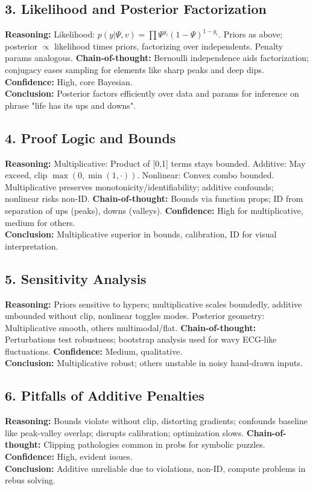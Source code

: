 \documentclass{article}
\begin{document}
\subsection{3. Likelihood and Posterior Factorization}
\textbf{Reasoning:} Likelihood: \(p(y|\Psi,v) = \prod \Psi^{y_i} (1-\Psi)^{1-y_i}\). Priors as above; posterior \(\propto\) likelihood times priors, factorizing over independents. Penalty params analogous. \textbf{Chain-of-thought:} Bernoulli independence aids factorization; conjugacy eases sampling for elements like sharp peaks and deep dips. \textbf{Confidence:} High, core Bayesian.\\
\textbf{Conclusion:} Posterior factors efficiently over data and params for inference on phrase "life has its ups and downs".

\subsection{4. Proof Logic and Bounds}
\textbf{Reasoning:} Multiplicative: Product of [0,1] terms stays bounded. Additive: May exceed, clip \(\max(0,\min(1,\cdot))\). Nonlinear: Convex combo bounded. Multiplicative preserves monotonicity/identifiability; additive confounds; nonlinear risks non-ID. \textbf{Chain-of-thought:} Bounds via function props; ID from separation of ups (peaks), downs (valleys). \textbf{Confidence:} High for multiplicative, medium for others.\\
\textbf{Conclusion:} Multiplicative superior in bounds, calibration, ID for visual interpretation.

\subsection{5. Sensitivity Analysis}
\textbf{Reasoning:} Priors sensitive to hypers; multiplicative scales boundedly, additive unbounded without clip, nonlinear toggles modes. Posterior geometry: Multiplicative smooth, others multimodal/flat. \textbf{Chain-of-thought:} Perturbations test robustness; bootstrap analysis used for wavy ECG-like fluctuations. \textbf{Confidence:} Medium, qualitative.\\
\textbf{Conclusion:} Multiplicative robust; others unstable in noisy hand-drawn inputs.

\subsection{6. Pitfalls of Additive Penalties}
\textbf{Reasoning:} Bounds violate without clip, distorting gradients; confounds baseline like peak-valley overlap; disrupts calibration; optimization slows. \textbf{Chain-of-thought:} Clipping pathologies common in probs for symbolic puzzles. \textbf{Confidence:} High, evident issues.\\
\textbf{Conclusion:} Additive unreliable due to violations, non-ID, compute problems in rebus solving.
\end{document}
